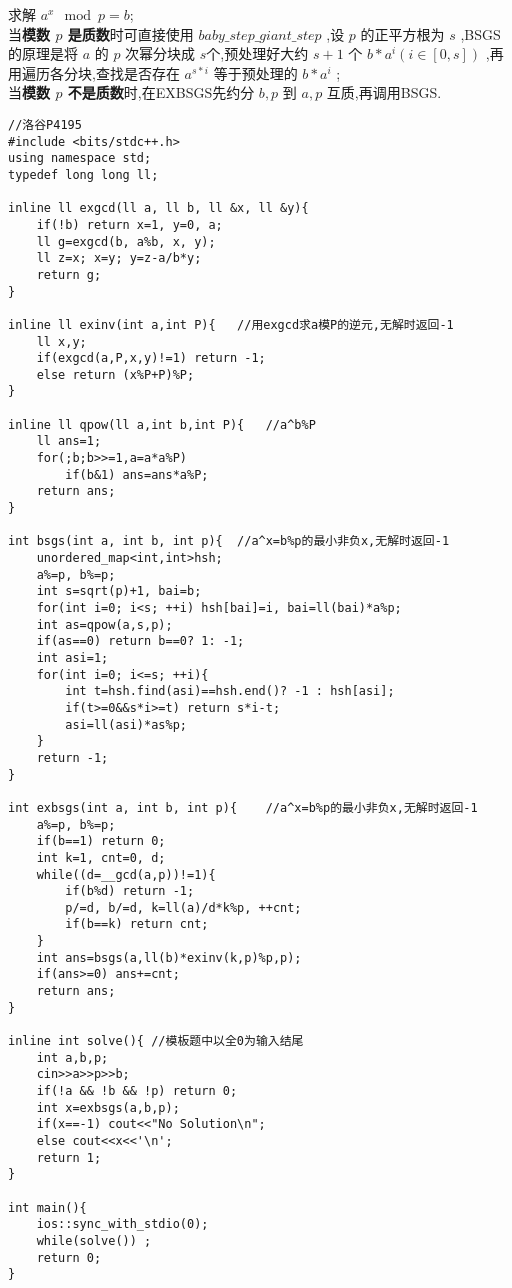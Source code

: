 求解 $a^x \mod p = b$;\\
当\textbf{模数 $p$ 是质数}时可直接使用 $baby\_step\_giant\_step$ ,设 $p$ 的正平方根为 $s$ ,BSGS的原理是将 $a$ 的 $p$ 次幂分块成 $s$个,预处理好大约 $s+1$ 个 $b*a^i(i\in[0,s])$ ,再用遍历各分块,查找是否存在 $a^{s*i}$ 等于预处理的 $b*a^i$ ;\\
当\textbf{模数 $p$ 不是质数}时,在EXBSGS先约分 $b,p$ 到 $a,p$ 互质,再调用BSGS.

\begin{lstlisting}
//洛谷P4195 
#include <bits/stdc++.h>
using namespace std;
typedef long long ll;

inline ll exgcd(ll a, ll b, ll &x, ll &y){
	if(!b) return x=1, y=0, a;
	ll g=exgcd(b, a%b, x, y);
	ll z=x; x=y; y=z-a/b*y;
	return g;
}

inline ll exinv(int a,int P){	//用exgcd求a模P的逆元,无解时返回-1
	ll x,y;
	if(exgcd(a,P,x,y)!=1) return -1;
	else return (x%P+P)%P;
}

inline ll qpow(ll a,int b,int P){	//a^b%P 
	ll ans=1;
	for(;b;b>>=1,a=a*a%P)
		if(b&1) ans=ans*a%P;
	return ans;
}

int bsgs(int a, int b, int p){	//a^x=b%p的最小非负x,无解时返回-1
	unordered_map<int,int>hsh;
	a%=p, b%=p;
	int s=sqrt(p)+1, bai=b;
	for(int i=0; i<s; ++i) hsh[bai]=i, bai=ll(bai)*a%p;
	int as=qpow(a,s,p);
	if(as==0) return b==0? 1: -1;
	int asi=1;
	for(int i=0; i<=s; ++i){
		int t=hsh.find(asi)==hsh.end()? -1 : hsh[asi];
		if(t>=0&&s*i>=t) return s*i-t;
		asi=ll(asi)*as%p;
	}
	return -1;
}

int exbsgs(int a, int b, int p){	//a^x=b%p的最小非负x,无解时返回-1
	a%=p, b%=p;
	if(b==1) return 0;
	int k=1, cnt=0, d;
	while((d=__gcd(a,p))!=1){
		if(b%d) return -1;
		p/=d, b/=d, k=ll(a)/d*k%p, ++cnt;
		if(b==k) return cnt;
	}
	int ans=bsgs(a,ll(b)*exinv(k,p)%p,p);
	if(ans>=0) ans+=cnt;
	return ans;
}

inline int solve(){	//模板题中以全0为输入结尾
	int a,b,p;
	cin>>a>>p>>b;
	if(!a && !b && !p) return 0;
	int x=exbsgs(a,b,p);
	if(x==-1) cout<<"No Solution\n";
	else cout<<x<<'\n';
	return 1;
}

int main(){
	ios::sync_with_stdio(0);
	while(solve()) ;
	return 0;
}

\end{lstlisting}